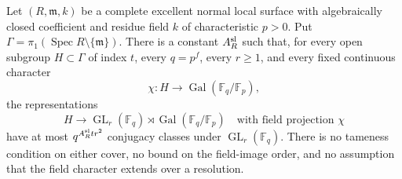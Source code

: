 \begin{theorem}
\label{D:arbitrary-cover-semilinear-hereditary-growth}
Let $(R,\mathfrak m,k)$ be a complete excellent normal local
surface with algebraically closed coefficient and residue
field $k$ of characteristic $p>0$. Put
$\Gamma=\pi_1(\operatorname{Spec}R\setminus\{\mathfrak m\})$.
There is a constant $A_R^{\rm sl}$ such that, for every open
subgroup $H\subset\Gamma$ of index $t$, every $q=p^f$,
every $r\ge1$, and every fixed continuous character
\[
 \chi:H\longrightarrow
                 \operatorname{Gal}(\mathbb F_q/\mathbb F_p),
                                                               \tag{D.SH.2}
\]
the representations
\[
 H\longrightarrow \operatorname{GL}_r(\mathbb F_q)
          \rtimes\operatorname{Gal}(\mathbb F_q/\mathbb F_p)
 \quad\text{with field projection }\chi
                                                               \tag{D.SH.3}
\]
have at most $q^{A_R^{\rm sl}tr^2}$ conjugacy classes under
$\operatorname{GL}_r(\mathbb F_q)$.
There is no tameness condition on either cover, no bound
on the field-image order, and no assumption that the
field character extends over a resolution.
\end{theorem}

